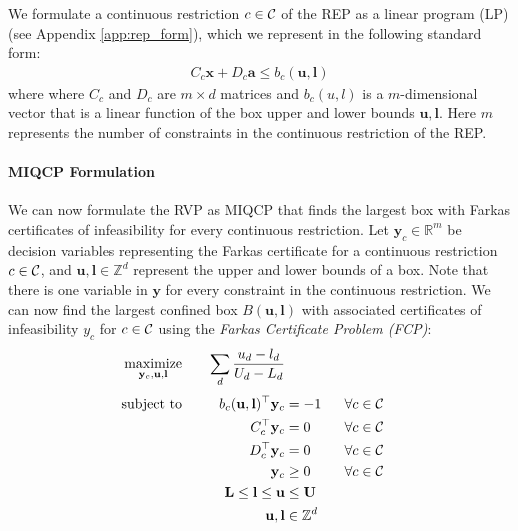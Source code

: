 We formulate a continuous restriction $c \in {\cal C}$ of the REP as a linear program (LP) (see Appendix \ref{app:rep_form}), which we represent in the following standard form:
\begin{align*}
C_c\mathbf{x} + D_c\mathbf{a} \leq b_c(\mathbf{u}, \mathbf{l})
\end{align*}
where where $C_c$ and $D_c$ are $m \times d$ matrices and $b_c(u,l)$ is a $m$-dimensional vector that is a linear function of the box upper and lower bounds $\mathbf{u}, \mathbf{l}$. Here $m$ represents the number of constraints in the continuous restriction of the REP.

\paragraph{MIQCP Formulation} We can now formulate the RVP as MIQCP that finds the largest box with Farkas certificates of infeasibility for every continuous restriction. Let $\mathbf{y}_c \in \mathbb{R}^{m}$ be decision variables representing the Farkas certificate for a continuous restriction $c \in {\cal C}$, and $\mathbf{u}, \mathbf{l} \in \mathbb{Z}^d$ represent the upper and lower bounds of a box. Note that there is one variable in $\mathbf{y}$ for every constraint in the continuous restriction. We can now find the largest confined box $B(\mathbf{u}, \mathbf{l})$ with associated certificates of infeasibility $y_c$ for $c \in {\cal C}$ using the \emph{Farkas Certificate Problem (FCP)}:
\begin{subequations}
\allowdisplaybreaks
\begin{align}
	\maximize_{\mathbf{y}_c, \mathbf{u}, \mathbf{l}}\quad&& \sum_d \frac{u_d - l_d}{U_d - L_d} \label{obj:f_size}\\[.1cm]
	\st\quad&& b_c(\mathbf{u}, \mathbf{l})^\top \mathbf{y}_c &= -1 ~~&& \forall c \in {\cal C} \label{const:f_neg_ray}\\
	&& C_c^\top \mathbf{y}_c &= 0 && \forall c \in {\cal C} \label{const:f_dual_feas_a} \\
	&& D_c^\top \mathbf{y}_c &= 0 && \forall c \in {\cal C}\label{const:f_dual_feas_b} \\
	&& \mathbf{y}_c &\geq 0 && \forall c \in {\cal C}\label{const:f_non_neg_y} \\
	&& \mathbf{L} \leq \mathbf{l} \leq \mathbf{u} &\leq \mathbf{U} && \label{const:f_box_bounds} \\
	&& \mathbf{u}, \mathbf{l} &\in \mathbb{Z}^d \label{const:f_ul_int}
\end{align}
\end{subequations}
